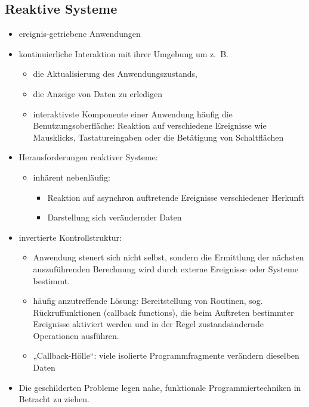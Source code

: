 \documentclass[a4paper]{article}
\begin{document}
\subsection*{Reaktive Systeme}
\label{sec:orgcd2f3b6}
\begin{itemize}
\item ereignis-getriebene Anwendungen
\item kontinuierliche Interaktion mit ihrer Umgebung
um z.~B.
\begin{itemize}
\item die Aktualisierung des Anwendungszustands,
\item die Anzeige von Daten zu erledigen
\item interaktivste Komponente einer Anwendung häufig die
Benutzungsoberfläche: Reaktion auf verschiedene Ereignisse wie
Mausklicks, Tastatureingaben oder die Betätigung von Schaltflächen
\end{itemize}
\item Herausforderungen reaktiver Systeme:
\begin{itemize}
\item inhärent nebenläufig:
\begin{itemize}
\item Reaktion auf asynchron auftretende Ereignisse verschiedener Herkunft
\item Darstellung sich verändernder Daten
\end{itemize}
\end{itemize}
\end{itemize}
\begin{itemize}
\item invertierte Kontrollstruktur:
\begin{itemize}
\item Anwendung steuert sich nicht selbst, sondern die Ermittlung der
nächsten auszuführenden Berechnung wird durch externe Ereignisse
oder Systeme bestimmt.
\item häufig anzutreffende Lösung: Bereitstellung von Routinen, sog.
Rückruffunktionen  (callback functions), die beim Auftreten
bestimmter Ereignisse aktiviert werden und in der Regel
zustandsändernde Operationen ausführen.
\item „Callback-Hölle“: viele isolierte Programmfragmente verändern
dieselben Daten
\end{itemize}
\item Die geschilderten Probleme legen nahe, funktionale
Programmiertechniken in Betracht zu ziehen.
\end{itemize}
\end{document}
